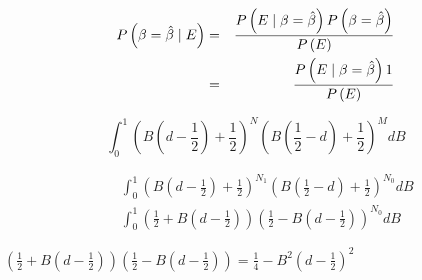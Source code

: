 \documentclass{amsart}
\theoremstyle{definition}
\theoremstyle{plain}
\numberwithin{equation}{section}
\begin{document}
\begin{eqnarray*}
P\left( \beta =\hat{\beta}\mid E\right)  &=&\frac{P\left( E\mid \beta =\hat{%
\beta}\right) P\left( \beta =\hat{\beta}\right) }{P\left( E\right) } \\
&=&\frac{P\left( E\mid \beta =\hat{\beta}\right) 1}{P\left( E\right) }
\end{eqnarray*}

\begin{equation*}
\int_{0}^{1}\left( B\left( d-\frac{1}{2}\right) +\frac{1}{2}\right)
^{N}\left( B\left( \frac{1}{2}-d\right) +\frac{1}{2}\right) ^{M}dB
\end{equation*}

\begin{eqnarray*}
&&\int_{0}^{1}\left( B\left( d-\frac{1}{2}\right) +\frac{1}{2}\right)
^{N_{1}}\left( B\left( \frac{1}{2}-d\right) +\frac{1}{2}\right) ^{N_{0}}dB \\
&&\int_{0}^{1}\left( \frac{1}{2}+B\left( d-\frac{1}{2}\right) \right) \left( 
\frac{1}{2}-B\left( d-\frac{1}{2}\right) \right) ^{N_{0}}dB
\end{eqnarray*}

$\left( \frac{1}{2}+B\left( d-\frac{1}{2}\right) \right) \left( \frac{1}{2}%
-B\left( d-\frac{1}{2}\right) \right) =\frac{1}{4}-B^{2}\left( d-\frac{1}{2}%
\right) ^{2}$



\end{document}
